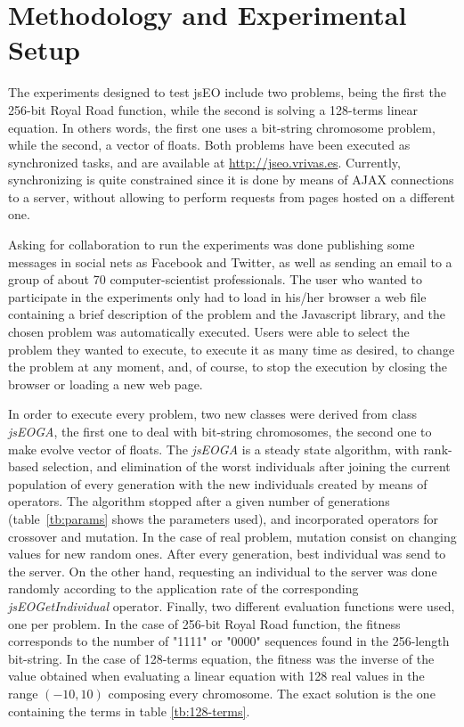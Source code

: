 \documentclass[runningheads,a4paper]{llncs}
\begin{document}
\section{Methodology and Experimental Setup}
\label{sec:method}
The experiments designed to test jsEO include two problems, being the first the 256-bit Royal Road function, while the second is solving a 128-terms linear equation. In others words, the first one uses a bit-string chromosome problem, while the second, a vector of floats. Both problems have been executed as synchronized tasks, and are available at \url{http://jseo.vrivas.es}. Currently, synchronizing is quite constrained since it is done by means of AJAX connections to a server, without allowing to perform requests from pages hosted on a different one. 

Asking for collaboration to run the experiments was done publishing some messages in social nets as Facebook and Twitter, as well as sending an email to a group of about 70 computer-scientist professionals. The user who wanted to participate in the experiments only had to load in his/her browser a web file containing a brief description of the problem and the Javascript library, and the chosen problem was automatically executed. Users were able to select the problem they wanted to execute, to execute it as many time as desired, to change the problem at any moment, and, of course, to stop the execution by closing the browser or loading a new web page.

In order to execute every problem, two new classes were derived from class \textit{jsEOGA}, the first one to deal with bit-string chromosomes, the second one to make evolve vector of floats. The \textit{jsEOGA} is a steady state algorithm, with rank-based selection, and elimination of the worst individuals after joining the current population of every generation with the new individuals created by means of operators. The algorithm stopped after a given number of generations (table~\ref{tb:params} shows the parameters used), and incorporated operators for crossover and mutation. In the case of real problem, mutation consist on changing values for new random ones. After every generation, best individual was send to the server. On the other hand, requesting an individual to the server was done randomly according to the application rate of the corresponding \textit{jsEOGetIndividual} operator. Finally, two different evaluation functions were used, one per problem. In the case of 256-bit Royal Road function, the fitness corresponds to the number of "1111" or "0000" sequences found in the 256-length bit-string. In the case of 128-terms equation, the fitness was the inverse of the value obtained when evaluating a linear equation with 128 real values in the range $(-10,10)$ composing every chromosome. The exact solution is the one containing the terms in table \ref{tb:128-terms}.
\end{document}
